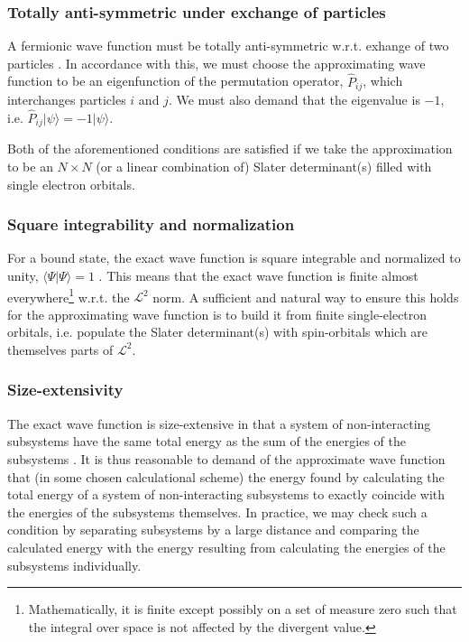 \documentclass[../../master.tex]{subfiles}
\begin{document}
\subsubsection*{Totally anti-symmetric under exchange of particles}
A fermionic wave function must be totally anti-symmetric w.r.t. exhange of two particles \cite{griffiths}. In accordance with this, we must choose the approximating wave function to be an eigenfunction of the permutation operator, $\hat P_{ij}$, which interchanges particles $i$ and $j$. We must also demand that the eigenvalue is $-1$, i.e. $\hat P_{ij} |\psi\rangle = -1|\psi\rangle$. 

Both of the aforementioned conditions are satisfied if we take the approximation to be an $N \times N$ (or a linear combination of) Slater determinant(s) filled with single electron orbitals.

\subsubsection*{Square integrability and normalization}
For a bound state, the exact wave function is square integrable and normalized to unity, $\langle \Psi|\Psi\rangle = 1$ \cite{helgaker}. This means that the exact wave function is finite almost everywhere\footnote{Mathematically, it is finite except possibly on a set of measure zero such that the integral over space is not affected by the divergent value.} w.r.t. the $\mathcal{L}^2$ norm. A sufficient and natural way to ensure this holds for the approximating wave function is to build it from finite single-electron orbitals, i.e. populate the Slater determinant(s) with spin-orbitals which are themselves parts of $\mathcal{L}^2$. 

\subsubsection*{Size-extensivity}
The exact wave function is size-extensive in that a system of non-interacting subsystems have the same total energy as the sum of the energies of the subsystems \cite{helgaker}. It is thus reasonable to demand of the approximate wave function that (in some chosen calculational scheme) the energy found by calculating the total energy of a system of non-interacting subsystems to exactly coincide with the energies of the subsystems themselves. In practice, we may check such a condition by separating subsystems by a large distance and comparing the calculated energy with the energy resulting from calculating the energies of the subsystems individually. 
\end{document}
